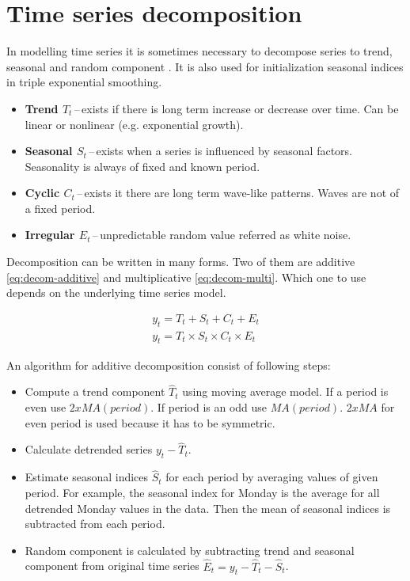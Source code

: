     \section{Time series decomposition} \label{sec:decomposition}
    In modelling time series it is sometimes necessary to decompose series to trend, seasonal and random component
    \cite{otexts}. It is also used for initialization seasonal indices in triple exponential smoothing.

    \begin{itemize}
        \item \textbf{Trend $ T_{t} $}\,--\,exists if there is long term increase or decrease over
            time. Can be linear or nonlinear (e.g. exponential growth).
        \item \textbf{Seasonal $ S_{t} $}\,--\,exists when a series is influenced by seasonal factors.
            Seasonality is always of fixed and known period.
        \item \textbf{Cyclic $ C_{t} $}\,--\,exists it there are long term wave-like patterns.
            Waves are not of a fixed period.
        \item \textbf{Irregular $ E_{t} $}\,--\,unpredictable random value referred as white
            noise. 
    \end{itemize}

    Decomposition can be written in many forms. Two of them are additive \ref{eq:decom-additive} and multiplicative
    \ref{eq:decom-multi}. Which one to use depends on the underlying time series model.

    \begin{gather} \label{eq:decom-additive}
        y_{t} = T_{t} + S_{t} + C_{t} + E_{t} \\
        y_{t} = T_{t} \times S_{t} \times C_{t} \times E_{t} \label{eq:decom-multi}
    \end{gather}

    An algorithm for additive decomposition consist of following steps:

    \begin{itemize}
        \item Compute a trend component $\hat{T}_t$ using moving average model. If a period is even use
        $2 x MA(period)$. If period is an odd use $MA(period)$. $2 x MA$ for even period is used because it
        has to be symmetric.
        \item Calculate detrended series $y_t - \hat{T}_t$.
        \item Estimate seasonal indices $\hat{S}_t$ for each period by averaging values of given period. For example,
         the seasonal index for Monday is the average for all detrended Monday values in the data. Then the mean of
         seasonal indices is subtracted from each period.
        \item Random component is calculated by subtracting trend and seasonal component from original time series
            $\hat{E}_t = y_t - \hat{T}_t - \hat{S}_t$.
    \end{itemize}


